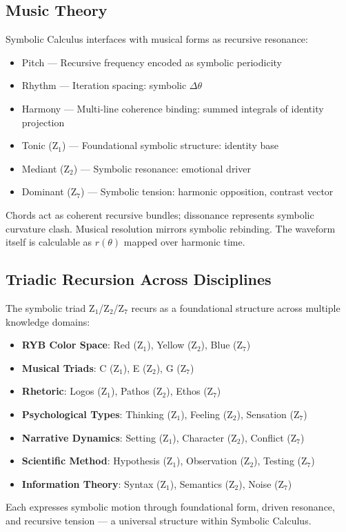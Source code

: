 \documentclass[12pt]{article}
\begin{document}
\subsection*{Music Theory}
Symbolic Calculus interfaces with musical forms as recursive resonance:
\begin{itemize}
  \item Pitch — Recursive frequency encoded as symbolic periodicity
  \item Rhythm — Iteration spacing: symbolic $\Delta\theta$
  \item Harmony — Multi-line coherence binding: summed integrals of identity projection
  \item Tonic (Z$_1$) — Foundational symbolic structure: identity base
  \item Mediant (Z$_2$) — Symbolic resonance: emotional driver
  \item Dominant (Z$_7$) — Symbolic tension: harmonic opposition, contrast vector
\end{itemize}
Chords act as coherent recursive bundles; dissonance represents symbolic curvature clash. Musical resolution mirrors symbolic rebinding. The waveform itself is calculable as $r(\theta)$ mapped over harmonic time.

\subsection*{Triadic Recursion Across Disciplines}
The symbolic triad Z$_1$/Z$_2$/Z$_7$ recurs as a foundational structure across multiple knowledge domains:
\begin{itemize}
  \item \textbf{RYB Color Space}: Red (Z$_1$), Yellow (Z$_2$), Blue (Z$_7$)
  \item \textbf{Musical Triads}: C (Z$_1$), E (Z$_2$), G (Z$_7$)
  \item \textbf{Rhetoric}: Logos (Z$_1$), Pathos (Z$_2$), Ethos (Z$_7$)
  \item \textbf{Psychological Types}: Thinking (Z$_1$), Feeling (Z$_2$), Sensation (Z$_7$)
  \item \textbf{Narrative Dynamics}: Setting (Z$_1$), Character (Z$_2$), Conflict (Z$_7$)
  \item \textbf{Scientific Method}: Hypothesis (Z$_1$), Observation (Z$_2$), Testing (Z$_7$)
  \item \textbf{Information Theory}: Syntax (Z$_1$), Semantics (Z$_2$), Noise (Z$_7$)
\end{itemize}
Each expresses symbolic motion through foundational form, driven resonance, and recursive tension — a universal structure within Symbolic Calculus.
\end{document}

